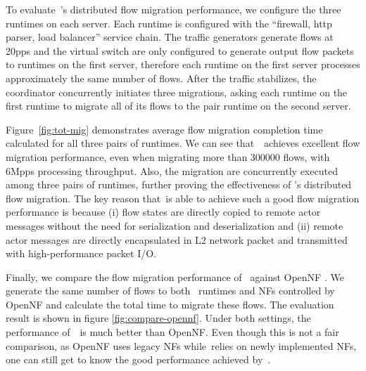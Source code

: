 To evaluate~\nfactor's distributed flow migration performance, we configure the three runtimes on each server. Each runtime is configured with the ``firewall, http parser, load balancer'' service chain. The traffic generators generate flows at 20pps and the virtual switch are only configured to generate output flow packets to runtimes on the first server, therefore each runtime on the first server processes approximately the same number of flows. After the traffic stabilizes, the coordinator concurrently initiates three migrations, asking each runtime on the first runtime to migrate all of its flows to the pair runtime on the second server.

Figure~\ref{fig:tot-mig} demonstrates average flow migration completion time calculated for all three pairs of runtimes. We can see that~\nfactor~achieves excellent flow migration performance, even when migrating more than 300000 flows, with 6Mpps processing throughput. Also, the migration are concurrently executed among three pairs of runtimes, further proving the effectiveness of \nfactor's distributed flow migration. The key reason that~\nfactor is able to achieve such a good flow migration performance is because (i) flow states are directly copied to remote actor messages without the need for serialization and deserialization and (ii) remote actor messages are directly encapsulated in L2 network packet and transmitted with high-performance packet I/O.

Finally, we compare the flow migration performance of \nfactor~against OpenNF \cite{gember2015opennf}. We generate the same number of flows to both \nfactor~runtimes and NFs controlled by OpenNF and calculate the total time to migrate these flows. The evaluation result is shown in figure \ref{fig:compare-opennf}. Under both settings, the performance of~\nfactor~is much better than OpenNF. Even though this is not a fair comparison, as OpenNF uses legacy NFs while~\nfactor relies on newly implemented NFs, one can still get to know the good performance achieved by~\nfactor.


